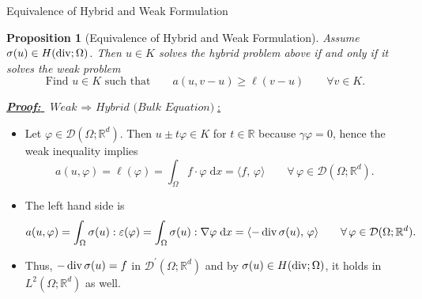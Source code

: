 \documentclass[10pt,aspectratio=169]{beamer}
\newtheorem{proposition}{Proposition}[section]
\def\R{{\mathbb R}}
\def\cD{{\mathcal D}}
\def\d{{\mathrm{d}}}
\def\dx{{\d x}}
\newcommand{\diver}{\operatornamewithlimits{div}}
\begin{document}
\begin{frame}{Equivalence of Hybrid and Weak Formulation}
	\begin{proposition}[Equivalence of Hybrid and Weak Formulation]
		Assume $\sigma(u)\in H(\diver;\Omega)$. Then $u\in K$ solves the hybrid problem above if and only if it solves the weak problem
		\begin{equation*}
			\text{Find }u\in K\text{ such that}\qquad a(u,v-u)\ge\ell(v-u)\qquad \forall v\in K.
		\end{equation*}
	\end{proposition}
	\underline{\textbf{\em Proof:} $\ \textit{Weak }\Rightarrow\textit{ Hybrid (Bulk Equation)}$:}
	\begin{itemize}
		\item Let $\varphi\in \cD(\Omega;\R^d)$. Then $u\pm t\varphi\in K$ for $t\in\R$ because $\gamma\varphi = 0$, hence the weak inequality implies
		      \begin{equation*}
			      a(u,\varphi)=\ell(\varphi)=\int_\Omega f\cdot \varphi\;\dx = \langle f,\,\varphi\rangle\qquad \forall\,\varphi\in \cD(\Omega;\R^d).
		      \end{equation*}
		\item The left hand side is
		      \begin{equation*}
			      a(u,\varphi) = \int_\Omega\sigma(u):\varepsilon(\varphi) = \int_\Omega\sigma(u):\nabla\varphi\;\dx = \langle -\diver\sigma(u),\,\varphi\rangle\qquad \forall\,\varphi\in \cD(\Omega;\R^d).
		      \end{equation*}
		\item Thus, $-\diver\sigma(u) = f$ in $\cD^\prime(\Omega;\R^d)$ and by $\sigma(u)\in H(\diver;\Omega)$, it holds in $L^2(\Omega;\R^d)$ as well.
	\end{itemize}
\end{frame}
\end{document}
